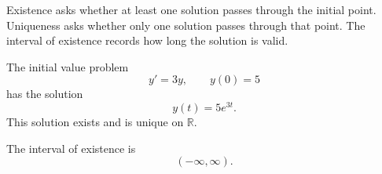 \begin{remark*}[Interpretation]
Existence asks whether at least one solution passes through the initial point. Uniqueness asks whether only one solution passes through that point. The interval of existence records how long the solution is valid.
\end{remark*}

\begin{example}
The initial value problem
\[
y'=3y,
\qquad
y(0)=5
\]
has the solution
\[
y(t)=5e^{3t}.
\]
This solution exists and is unique on $\mathbb{R}$.

The interval of existence is
\[
(-\infty,\infty).
\]
\end{example}




















